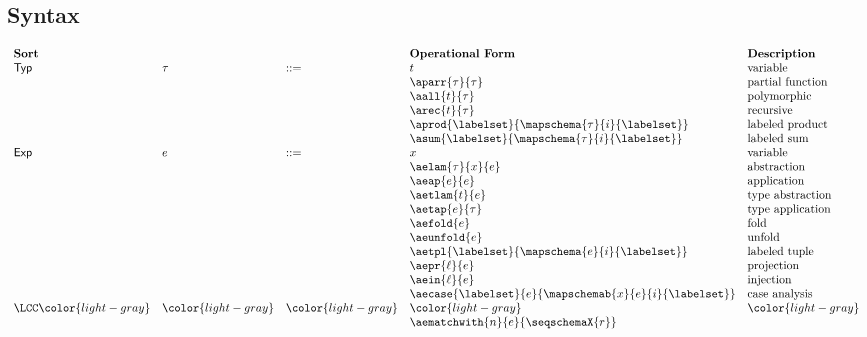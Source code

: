 \subsection{Syntax}
\[\begin{array}{lllllll}
\textbf{Sort} & & 
& \textbf{Operational Form} 
& \textbf{Description}\\
\mathsf{Typ} & \tau & ::= & t 
& \text{variable}\\
&&& \aparr{\tau}{\tau} 
& \text{partial function}\\
&&& \aall{t}{\tau} 
& \text{polymorphic}\\
&&& \arec{t}{\tau} 
& \text{recursive}\\
&&& \aprod{\labelset}{\mapschema{\tau}{i}{\labelset}} 
& \text{labeled product}\\
&&& \asum{\labelset}{\mapschema{\tau}{i}{\labelset}} 
& \text{labeled sum}\\
\mathsf{Exp} & e & ::= & x 
& \text{variable}\\
&&& \aelam{\tau}{x}{e} 
& \text{abstraction}\\
&&& \aeap{e}{e} 
& \text{application}\\
&&& \aetlam{t}{e} 
& \text{type abstraction}\\
&&& \aetap{e}{\tau} 
& \text{type application}\\
&&& \aefold{e} 
& \text{fold}\\
&&& \aeunfold{e} 
& \text{unfold}\\
&&& \aetpl{\labelset}{\mapschema{e}{i}{\labelset}} 
& \text{labeled tuple}\\
&&& \aepr{\ell}{e} 
& \text{projection}\\
&&& \aein{\ell}{e} 
& \text{injection}\\
&&& \aecase{\labelset}{e}{\mapschemab{x}{e}{i}{\labelset}} 
& \text{case analysis}\\
\LCC \color{light-gray} & \color{light-gray} & \color{light-gray} 
& \color{light-gray} & \color{light-gray} \\
&&
& \aematchwith{n}{e}{\seqschemaX{r}}

\end{array}\]
